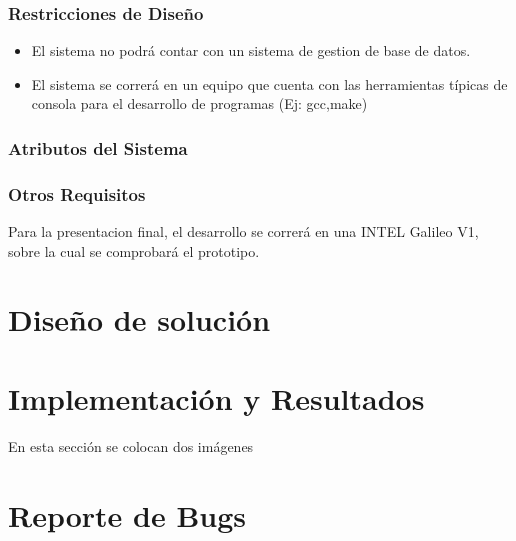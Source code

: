 \documentclass[10pt, a4paper,notitlepage]{article}
\begin{document}
\subsubsection{Restricciones de Diseño}
\begin{itemize}
	\item El sistema no podrá contar con un sistema de gestion de base de datos.
	\item El sistema se correrá en un equipo que cuenta con las herramientas típicas de consola para el desarrollo de programas (Ej: gcc,make)
\end{itemize}


\subsubsection{Atributos del Sistema}
\subsubsection{Otros Requisitos }
Para la presentacion final, el desarrollo se correrá en una INTEL Galileo V1, sobre la cual se comprobará el prototipo.
\section{ Diseño de solución}




\section{Implementación y Resultados}
En esta sección se colocan dos imágenes

\section{Reporte de Bugs}
\end{document}
